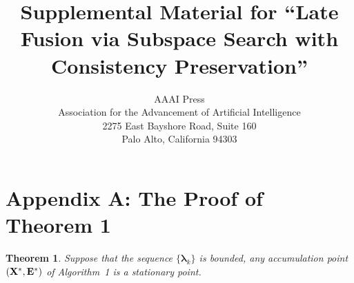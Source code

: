 \documentclass[letterpaper]{article}
\newtheorem{theorem}{Theorem}
\def\bE{{\bf E}}
\def\blambda{{\bm \lambda}}
\def\bX{{\bf X}}
\def\bX{{\bf X}}
\begin{document}
%



\title{Supplemental Material 
for ``Late Fusion via Subspace Search with Consistency Preservation''}

\author{AAAI Press\\
Association for the Advancement of Artificial Intelligence\\
2275 East Bayshore Road, Suite 160\\
Palo Alto, California 94303\\
}



\maketitle

\section{Appendix A: The Proof of Theorem 1}

\begin{theorem}\label{theorem:alm_convergence}
  Suppose that the sequence $\{ \blambda_{k} \}$ is bounded, any accumulation point $(\bX^*, \bE^*)$ of Algorithm~1 is a stationary point.
\end{theorem}
\end{document}
